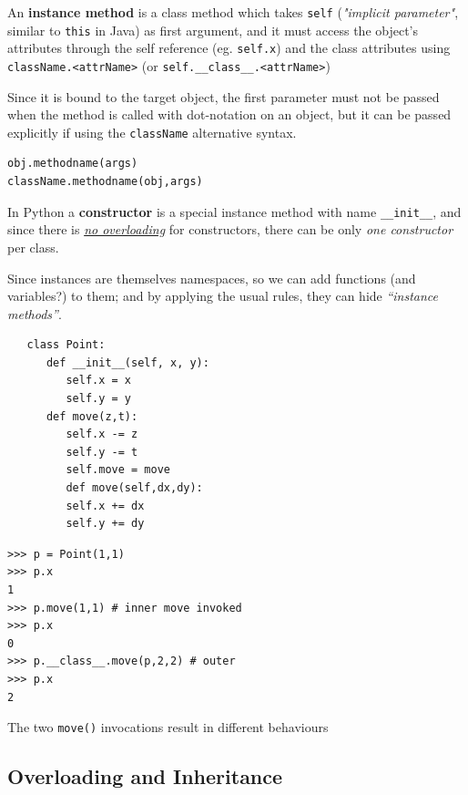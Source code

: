 An \textbf{instance method} is a class method which takes \lstinline|self| (\textit{"implicit parameter"}, similar to \lstinline|this| in Java) as first argument, and it  must access the object's attributes through the self reference
(eg. \lstinline|self.x|) and the class attributes using \lstinline|className.<attrName>| (or
\lstinline|self.__class__.<attrName>|)

Since it is bound to the target object, the first parameter must not be passed when the method is called with
dot-notation on an object, but it can be passed explicitly if using the \lstinline|className| alternative syntax.
\begin{lstlisting}
obj.methodname(args)
className.methodname(obj,args)
\end{lstlisting}
\nl

In Python a \textbf{constructor} is a special instance method with name \lstinline|__init__|, and since there is \textit{\underline{no overloading}} for constructors, there can be only \textit{one constructor} per class.

Since instances are themselves namespaces, so we can add functions (and variables?) to them; and by applying the usual rules, they can hide \textit{``instance methods''}.

\begin{paracol}{2}
   
\begin{lstlisting}
   class Point:
      def __init__(self, x, y):
         self.x = x
         self.y = y
      def move(z,t):
         self.x -= z
         self.y -= t
         self.move = move
         def move(self,dx,dy):
         self.x += dx
         self.y += dy
\end{lstlisting}
\switchcolumn
\begin{lstlisting}
>>> p = Point(1,1)
>>> p.x
1
>>> p.move(1,1) # inner move invoked
>>> p.x
0
>>> p.__class__.move(p,2,2) # outer
>>> p.x
2
\end{lstlisting}
The two \lstinline|move()| invocations result in different behaviours
\end{paracol}

\subsection{Overloading and Inheritance}


